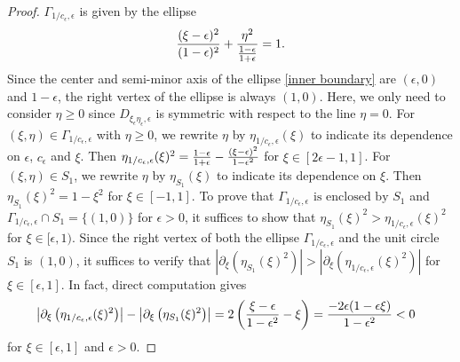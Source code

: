 \documentclass[1 [leqno, 11pt]{amsart}
\numberwithin{equation}{section}
\let\ep=\epsilon
\begin{document}
\begin{CJK*}{GBK}{song}
\begin{proof}
$\Gamma_{1/c_\ep,\ep}$ is given by the ellipse
\begin{align}\label{inner boundary}
\frac{(\xi - \ep)^2}{(1-\ep)^2} + {\eta^2\over {1-\ep\over 1+\ep}}=1.
\end{align}
Since the center and semi-minor axis of the ellipse \eqref{inner boundary} are $(\ep,0)$ and $1-\ep$, the right vertex of the ellipse is always $(1,0)$.
Here, we only need to consider $\eta\geq0$ since $D_{\xi_{\ep}\eta_{\ep},\ep}$ is symmetric with respect to the line $\eta=0$.
For $(\xi,\eta)\in \Gamma_{1/c_\ep,\ep}$ with $\eta\geq0$, we rewrite $\eta$ by $\eta_{1/c_\ep,\ep}(\xi)$ to indicate its dependence on  $\ep$, $c_\ep$ and $\xi$. Then $\eta_{1/c_\ep,\ep}(\xi)^2={1-\ep\over 1+\ep}-\frac{(\xi - \ep)^2}{1-\ep^2}$ for $\xi\in[2\ep-1,1]$. For  $(\xi,\eta)\in S_1$, we rewrite $\eta$ by $\eta_{S_1}(\xi)$ to indicate its dependence on $\xi$. Then $\eta_{S_1}(\xi)^2=1-\xi^2$ for $\xi\in[-1,1]$.
To prove that $\Gamma_{1/c_\ep,\ep}\text{  is  enclosed by } S_1$ and
$\Gamma_{1/c_\ep,\ep}\cap S_1=\{(1,0)\}$  for $\ep>0$, it suffices to show that $\eta_{S_1}(\xi)^2>\eta_{1/c_\ep,\ep}(\xi)^2$ for $\xi\in[\ep,1)$.
Since the right vertex of both the ellipse $\Gamma_{1/c_\ep,\ep}$ and the unit circle $S_1$ is  $(1,0)$, it suffices to verify that $\left|\partial_{\xi}\left(\eta_{S_1}(\xi)^2\right)\right|>\left|\partial_{\xi}\left(\eta_{1/c_\ep,\ep}(\xi)^2\right)\right|$ for $\xi\in[\ep,1]$. In fact, direct computation gives
\begin{align*}
&\left|\partial_{\xi}\left(\eta_{1/c_\ep,\ep}(\xi)^2\right)\right|-\left|\partial_{\xi}\left(\eta_{S_1}(\xi)^2\right)\right|=2\left(\frac{\xi - \ep}{1-\ep^2}-\xi\right)
={-2\ep(1-\ep\xi)\over 1-\ep^2}<0
\end{align*}
 for $\xi\in[\ep,1]$ and $\ep>0$.


\end{proof}
\end{CJK*}
\end{document}
